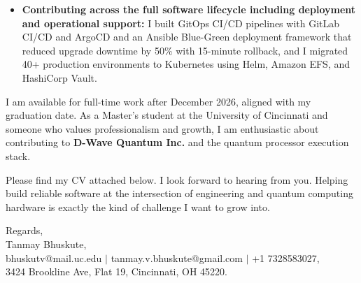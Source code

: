 \documentclass[11pt]{letter}
\begin{document}
\begin{letter}{}
\begin{itemize}[leftmargin=*, itemsep=0.45em]
    \item \textbf{Contributing across the full software lifecycle including deployment and operational support:} I built GitOps CI/CD pipelines with GitLab CI/CD and ArgoCD and an Ansible Blue-Green deployment framework that reduced upgrade downtime by 50\% with 15-minute rollback, and I migrated 40+ production environments to Kubernetes using Helm, Amazon EFS, and HashiCorp Vault.
\end{itemize}

I am available for full-time work after December 2026, aligned with my graduation date. As a Master's student at the University of Cincinnati and someone who values professionalism and growth, I am enthusiastic about contributing to \textbf{D-Wave Quantum Inc.} and the quantum processor execution stack.

Please find my CV attached below. I look forward to hearing from you. Helping build reliable software at the intersection of engineering and quantum computing hardware is exactly the kind of challenge I want to grow into.

{\setlength{\parskip}{0pt}
Regards,\\
Tanmay Bhuskute,\\
bhuskutv@mail.uc.edu $\mid$ tanmay.v.bhuskute@gmail.com $\mid$ +1 7328583027,\\
3424 Brookline Ave, Flat 19, Cincinnati, OH 45220.
}

\end{letter}
\end{document}
